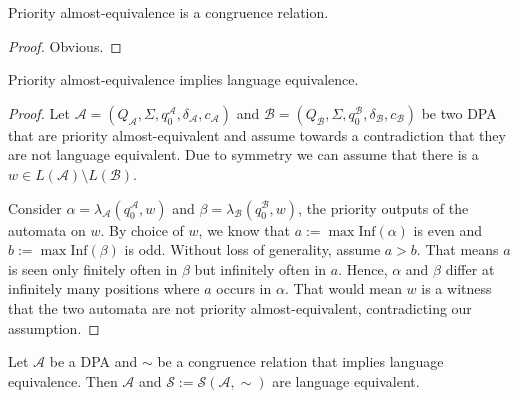 \begin{lem}
	Priority almost-equivalence is a congruence relation.
\end{lem}

\begin{proof}
	Obvious.
\end{proof}


\begin{lem}
	Priority almost-equivalence implies language equivalence.
\end{lem}

\begin{proof}
	Let $\mathcal{A} = (Q_\mathcal{A}, \Sigma, q_0^\mathcal{A}, \delta_\mathcal{A}, c_\mathcal{A})$ and $\mathcal{B} = (Q_\mathcal{B}, \Sigma, q_0^\mathcal{B}, \delta_\mathcal{B}, c_\mathcal{B})$ be two DPA that are priority almost-equivalent and assume towards a contradiction that they are not language equivalent. Due to symmetry we can assume that there is a $w \in L(\mathcal{A}) \setminus L(\mathcal{B})$. 
	
	Consider $\alpha = \lambda_\mathcal{A}(q_0^\mathcal{A}, w)$ and $\beta = \lambda_\mathcal{B}(q_0^\mathcal{B}, w)$, the priority outputs of the automata on $w$. By choice of $w$, we know that $a := \max \text{Inf}(\alpha)$ is even and $b := \max \text{Inf}(\beta)$ is odd. Without loss of generality, assume $a > b$. That means $a$ is seen only finitely often in $\beta$ but infinitely often in $a$. Hence, $\alpha$ and $\beta$ differ at infinitely many positions where $a$ occurs in $\alpha$. That would mean $w$ is a witness that the two automata are not priority almost-equivalent, contradicting our assumption.
\end{proof}


\begin{lem}
	Let $\mathcal{A}$ be a DPA and $\sim$ be a congruence relation that implies language equivalence. Then $\mathcal{A}$ and $\mathcal{S} := \mathcal{S}(\mathcal{A}, \sim)$ are language equivalent.
\end{lem}

